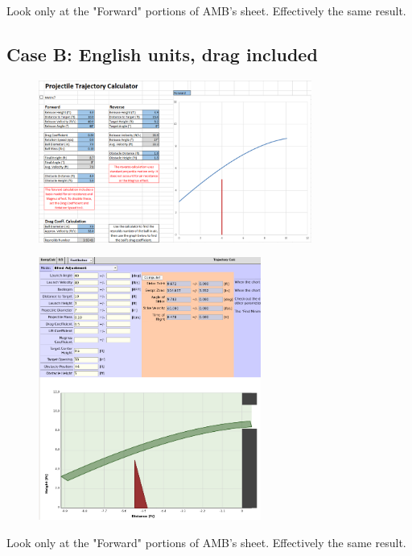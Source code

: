 \documentclass[10pt,letterpaper]{article}
\begin{document}
	Look only at the "Forward" portions of AMB's sheet. Effectively the same result.

	\newpage
	\subsection*{Case B: English units, drag included}
	\begin{figure}[H]
		\includegraphics[width=0.8\textwidth]{validation/trajectory_AMB_B.png}
	\end{figure}

	\begin{figure}[H]
		\includegraphics[width=0.65\textwidth]{validation/trajectory_EC_B.png}
	\end{figure}

	Look only at the "Forward" portions of AMB's sheet. Effectively the same result.
	
\end{document}
